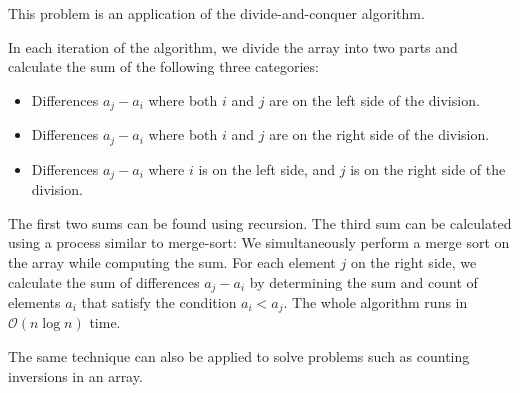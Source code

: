 This problem is an application of the divide-and-conquer algorithm.

In each iteration of the algorithm, we divide the array into two parts and calculate the sum of the following three categories:

\begin{itemize}
    \item Differences $a_j - a_i$ where both $i$ and $j$ are on the left side of the division.
    \item Differences $a_j - a_i$ where both $i$ and $j$ are on the right side of the division.
    \item Differences $a_j - a_i$ where $i$ is on the left side, and $j$ is on the right side of the division.
\end{itemize}

The first two sums can be found using recursion. The third sum can be calculated using a process similar to merge-sort:
We simultaneously perform a merge sort on the array while computing the sum. 
For each element $j$ on the right side, we calculate the sum of differences $a_j - a_i$ by determining the sum and count of elements $a_i$ 
that satisfy the condition $a_i < a_j$. The whole algorithm runs in $\mathcal{O}(n \log n)$ time.

The same technique can also be applied to solve problems such as counting inversions in an array.
